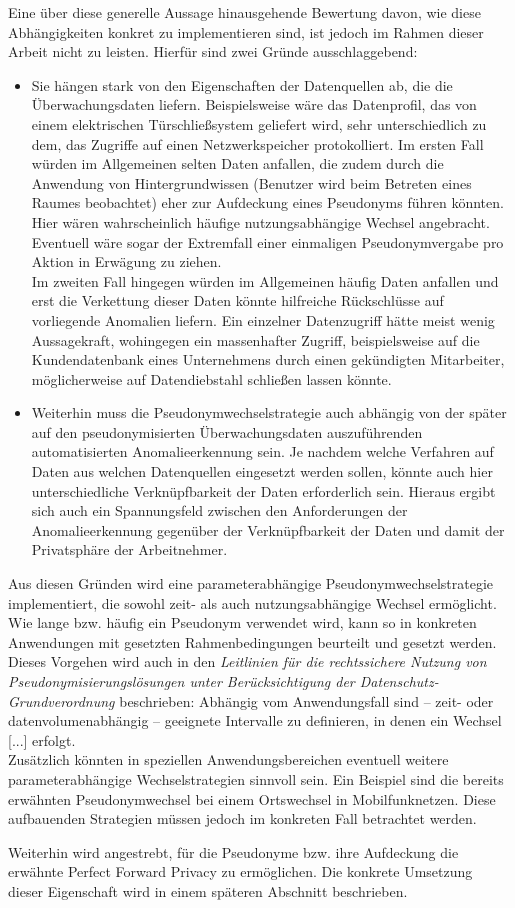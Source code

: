 Eine über diese generelle Aussage hinausgehende Bewertung davon, wie diese Abhängigkeiten konkret zu implementieren sind, ist jedoch im Rahmen dieser Arbeit nicht zu leisten. Hierfür sind zwei Gründe ausschlaggebend:
\begin{itemize}
  \item Sie hängen stark von den Eigenschaften der Datenquellen ab, die die Überwachungsdaten liefern. Beispielsweise wäre das Datenprofil, das von einem elektrischen Türschließsystem geliefert wird, sehr unterschiedlich zu dem, das Zugriffe auf einen Netzwerkspeicher protokolliert. Im ersten Fall würden im Allgemeinen selten Daten anfallen, die zudem durch die Anwendung von Hintergrundwissen (Benutzer wird beim Betreten eines Raumes beobachtet) eher zur Aufdeckung eines Pseudonyms führen könnten. Hier wären wahrscheinlich häufige nutzungsabhängige Wechsel angebracht. Eventuell wäre sogar der Extremfall einer einmaligen Pseudonymvergabe pro Aktion in Erwägung zu ziehen.\\
  Im zweiten Fall hingegen würden im Allgemeinen häufig Daten anfallen und erst die Verkettung dieser Daten könnte hilfreiche Rückschlüsse auf vorliegende Anomalien liefern. Ein einzelner Datenzugriff hätte meist wenig Aussagekraft, wohingegen ein massenhafter Zugriff, beispielsweise auf die Kundendatenbank eines Unternehmens durch einen gekündigten Mitarbeiter, möglicherweise auf Datendiebstahl schließen lassen könnte.
  
  \item Weiterhin muss die Pseudonymwechselstrategie auch abhängig von der später auf den pseudonymisierten Überwachungsdaten auszuführenden automatisierten Anomalieerkennung sein. Je nachdem welche Verfahren auf Daten aus welchen Datenquellen eingesetzt werden sollen, könnte auch hier unterschiedliche Verknüpfbarkeit der Daten erforderlich sein. Hieraus ergibt sich auch ein Spannungsfeld zwischen den Anforderungen der Anomalieerkennung gegenüber der Verknüpfbarkeit der Daten und damit der Privatsphäre der Arbeitnehmer.
\end{itemize}

Aus diesen Gründen wird eine parameterabhängige Pseudonymwechselstrategie implementiert, die sowohl zeit- als auch nutzungsabhängige Wechsel ermöglicht. Wie lange bzw. häufig ein Pseudonym verwendet wird, kann so in konkreten Anwendungen mit gesetzten Rahmenbedingungen beurteilt und gesetzt werden.
Dieses Vorgehen wird auch in den \textit{Leitlinien für die rechtssichere Nutzung von Pseudonymisierungslösungen unter Berücksichtigung der Datenschutz-Grundverordnung} beschrieben: \glqq Abhängig vom Anwendungsfall sind – zeit- oder datenvolumenabhängig – geeignete Intervalle zu definieren, in denen ein Wechsel [...] erfolgt.\grqq{}\cite{schwartmann2017} \\
Zusätzlich könnten in speziellen Anwendungsbereichen eventuell weitere parameterabhängige Wechselstrategien sinnvoll sein. Ein Beispiel sind die bereits erwähnten Pseudonymwechsel bei einem Ortswechsel in Mobilfunknetzen. Diese aufbauenden Strategien müssen jedoch im konkreten Fall betrachtet werden.

Weiterhin wird angestrebt, für die Pseudonyme bzw. ihre Aufdeckung die erwähnte Perfect Forward Privacy zu ermöglichen. Die konkrete Umsetzung dieser Eigenschaft wird in einem späteren Abschnitt beschrieben.